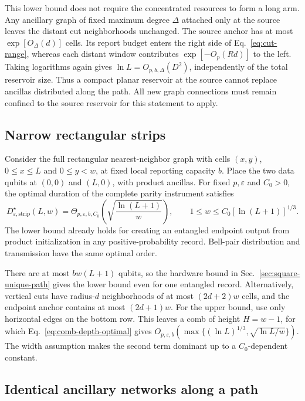 \documentclass[aps,prl,twocolumn,superscriptaddress,longbibliography,reprint,floatfix]{revtex4-2}
\newcommand{\eps}{\varepsilon}
\begin{document}
This lower bound does not require the concentrated resources to form
a long arm. Any ancillary graph of fixed maximum degree $\Delta$ attached
only at the source leaves the distant cut neighborhoods unchanged.
The source anchor has at most $\exp[O_\Delta(d)]$ cells. Its report budget
enters the right side of Eq.~\eqref{eq:cut-range}, whereas each distant
window contributes $\exp[-O_p(Rd)]$ to the left. Taking logarithms
again gives $\ln L=O_{p,b,\Delta}(D^2)$, independently of the total reservoir
size. Thus a compact planar reservoir at the source cannot replace
ancillas distributed along the path. All new graph connections must
remain confined to the source reservoir for this statement to apply.

\subsection{Narrow rectangular strips}
\label{sec:narrow-strips}
Consider the full rectangular nearest-neighbor graph with cells
$(x,y)$, $0\le x\le L$ and $0\le y<w$, at fixed local reporting
capacity $b$. Place the two data qubits at $(0,0)$ and $(L,0)$,
with product ancillas. For fixed $p,\eps$ and $C_0>0$, the optimal
duration of the complete parity instrument satisfies
\begin{equation}
 D^{\star}_{\eps,\mathrm{strip}}(L,w)
 =\Theta_{p,\eps,b,C_0}\!\left(\sqrt{\frac{\ln(L+1)}{w}}\right),
 \qquad 1\le w\le C_0[\ln(L+1)]^{1/3}.
 \label{eq:narrow-strip-time}
\end{equation}
The lower bound already holds for creating an entangled endpoint output
from product initialization in any positive-probability record.
Bell-pair distribution and transmission
have the same optimal order.

There are at most $bw(L+1)$ qubits, so the hardware bound in
Sec.~\ref{sec:square-unique-path} gives the lower bound even for one
entangled record. Alternatively, vertical cuts have radius-$d$
neighborhoods of at most $(2d+2)w$ cells, and the endpoint anchor
contains at most $(2d+1)w$. For the upper bound, use only horizontal
edges on the bottom row. This leaves a comb of height $H=w-1$, for
which Eq.~\eqref{eq:comb-depth-optimal} gives
$O_{p,\eps,b}(\max\{(\ln L)^{1/3},\sqrt{\ln L/w}\})$.
The width assumption makes the second term dominant up to a
$C_0$-dependent constant.

\subsection{Identical ancillary networks along a path}
\label{sec:reservoir-profile}
\end{document}
